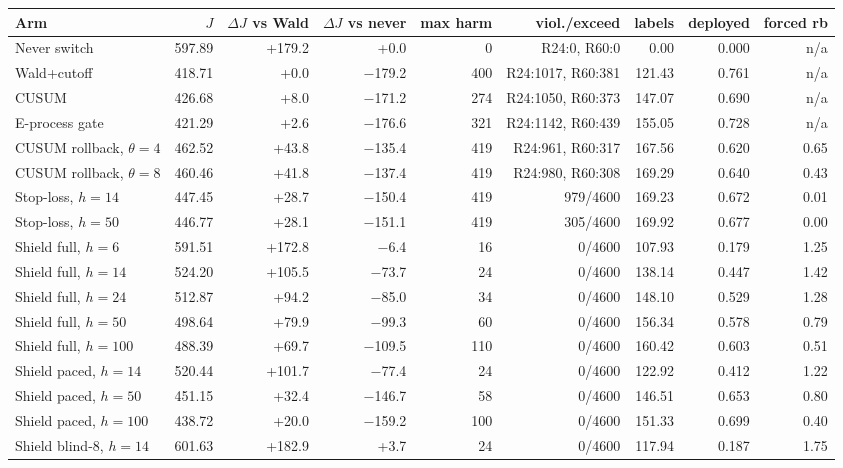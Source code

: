 \begin{tabular}{@{}l r r r r r r r r@{}}
\toprule
Arm & $J$ & $\Delta J$ vs Wald & $\Delta J$ vs never & max harm & viol./exceed & labels & deployed & forced rb \\
\midrule
Never switch & 597.89 & +179.2 & +0.0 & 0 & R24:0, R60:0 & 0.00 & 0.000 & n/a \\
Wald+cutoff & 418.71 & +0.0 & $-$179.2 & 400 & R24:1017, R60:381 & 121.43 & 0.761 & n/a \\
CUSUM & 426.68 & +8.0 & $-$171.2 & 274 & R24:1050, R60:373 & 147.07 & 0.690 & n/a \\
E-process gate & 421.29 & +2.6 & $-$176.6 & 321 & R24:1142, R60:439 & 155.05 & 0.728 & n/a \\
CUSUM rollback, $\theta=4$ & 462.52 & +43.8 & $-$135.4 & 419 & R24:961, R60:317 & 167.56 & 0.620 & 0.65 \\
CUSUM rollback, $\theta=8$ & 460.46 & +41.8 & $-$137.4 & 419 & R24:980, R60:308 & 169.29 & 0.640 & 0.43 \\
Stop-loss, $h=14$ & 447.45 & +28.7 & $-$150.4 & 419 & 979/4600 & 169.23 & 0.672 & 0.01 \\
Stop-loss, $h=50$ & 446.77 & +28.1 & $-$151.1 & 419 & 305/4600 & 169.92 & 0.677 & 0.00 \\
Shield full, $h=6$ & 591.51 & +172.8 & $-$6.4 & 16 & 0/4600 & 107.93 & 0.179 & 1.25 \\
Shield full, $h=14$ & 524.20 & +105.5 & $-$73.7 & 24 & 0/4600 & 138.14 & 0.447 & 1.42 \\
Shield full, $h=24$ & 512.87 & +94.2 & $-$85.0 & 34 & 0/4600 & 148.10 & 0.529 & 1.28 \\
Shield full, $h=50$ & 498.64 & +79.9 & $-$99.3 & 60 & 0/4600 & 156.34 & 0.578 & 0.79 \\
Shield full, $h=100$ & 488.39 & +69.7 & $-$109.5 & 110 & 0/4600 & 160.42 & 0.603 & 0.51 \\
Shield paced, $h=14$ & 520.44 & +101.7 & $-$77.4 & 24 & 0/4600 & 122.92 & 0.412 & 1.22 \\
Shield paced, $h=50$ & 451.15 & +32.4 & $-$146.7 & 58 & 0/4600 & 146.51 & 0.653 & 0.80 \\
Shield paced, $h=100$ & 438.72 & +20.0 & $-$159.2 & 100 & 0/4600 & 151.33 & 0.699 & 0.40 \\
Shield blind-8, $h=14$ & 601.63 & +182.9 & +3.7 & 24 & 0/4600 & 117.94 & 0.187 & 1.75 \\
\bottomrule
\end{tabular}
